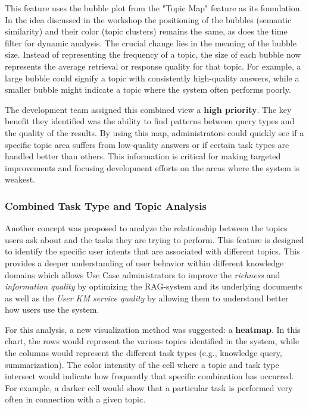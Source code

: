 \documentclass[
	english,
	ruledheaders=section,%
	class=report,%
	thesis={type=bachelor},%
	accentcolor=1b,%
	custommargins=true,%
	marginpar=false,%
	parskip=half-,%
	fontsize=11pt,%
	DIV=14,
]{tudapub}
\begin{document}
This feature uses the bubble plot from the "Topic Map" feature as its foundation. In the idea discussed in the workshop the positioning of the bubbles (semantic similarity) and their color (topic clusters) remains the same, as does the time filter for dynamic analysis. The crucial change lies in the meaning of the bubble size. Instead of representing the frequency of a topic, the size of each bubble now represents the average retrieval or response quality for that topic. For example, a large bubble could signify a topic with consistently high-quality answers, while a smaller bubble might indicate a topic where the system often performs poorly.

The development team assigned this combined view a \textbf{high priority}. The key benefit they identified was the ability to find patterns between query types and the quality of the results. By using this map, administrators could quickly see if a specific topic area suffers from low-quality answers or if certain task types are handled better than others. This information is critical for making targeted improvements and focusing development efforts on the areas where the system is weakest.
\subsubsection{Combined Task Type and Topic Analysis}
Another concept was proposed to analyze the relationship between the topics users ask about and the tasks they are trying to perform. This feature is designed to identify the specific user intents that are associated with different topics. This provides a deeper understanding of user behavior within different knowledge domains which allows Use Case administrators to improve the \textit{richness} and \textit{information quality} \parencite[pp.~57--58]{DeloneMcLean2003ISSuccessTenYearUpdate} by optimizing the RAG-system and its underlying documents as well as the \textit{User KM service quality} \parencite[pp.~58--59]{DeloneMcLean2003ISSuccessTenYearUpdate} by allowing them to understand better how users use the system.

For this analysis, a new visualization method was suggested: a \textbf{heatmap}. In this chart, the rows would represent the various topics identified in the system, while the columns would represent the different task types (e.g., knowledge query, summarization). The color intensity of the cell where a topic and task type intersect would indicate how frequently that specific combination has occurred. For example, a darker cell would show that a particular task is performed very often in connection with a given topic.
\end{document}
